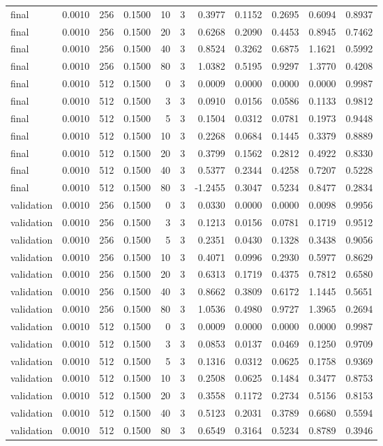 \begin{tabular}{lrrrrrrrrrr}
final & 0.0010 & 256 & 0.1500 & 10 & 3 & 0.3977 & 0.1152 & 0.2695 & 0.6094 & 0.8937 \\
final & 0.0010 & 256 & 0.1500 & 20 & 3 & 0.6268 & 0.2090 & 0.4453 & 0.8945 & 0.7462 \\
final & 0.0010 & 256 & 0.1500 & 40 & 3 & 0.8524 & 0.3262 & 0.6875 & 1.1621 & 0.5992 \\
final & 0.0010 & 256 & 0.1500 & 80 & 3 & 1.0382 & 0.5195 & 0.9297 & 1.3770 & 0.4208 \\
final & 0.0010 & 512 & 0.1500 & 0 & 3 & 0.0009 & 0.0000 & 0.0000 & 0.0000 & 0.9987 \\
final & 0.0010 & 512 & 0.1500 & 3 & 3 & 0.0910 & 0.0156 & 0.0586 & 0.1133 & 0.9812 \\
final & 0.0010 & 512 & 0.1500 & 5 & 3 & 0.1504 & 0.0312 & 0.0781 & 0.1973 & 0.9448 \\
final & 0.0010 & 512 & 0.1500 & 10 & 3 & 0.2268 & 0.0684 & 0.1445 & 0.3379 & 0.8889 \\
final & 0.0010 & 512 & 0.1500 & 20 & 3 & 0.3799 & 0.1562 & 0.2812 & 0.4922 & 0.8330 \\
final & 0.0010 & 512 & 0.1500 & 40 & 3 & 0.5377 & 0.2344 & 0.4258 & 0.7207 & 0.5228 \\
final & 0.0010 & 512 & 0.1500 & 80 & 3 & -1.2455 & 0.3047 & 0.5234 & 0.8477 & 0.2834 \\
validation & 0.0010 & 256 & 0.1500 & 0 & 3 & 0.0330 & 0.0000 & 0.0000 & 0.0098 & 0.9956 \\
validation & 0.0010 & 256 & 0.1500 & 3 & 3 & 0.1213 & 0.0156 & 0.0781 & 0.1719 & 0.9512 \\
validation & 0.0010 & 256 & 0.1500 & 5 & 3 & 0.2351 & 0.0430 & 0.1328 & 0.3438 & 0.9056 \\
validation & 0.0010 & 256 & 0.1500 & 10 & 3 & 0.4071 & 0.0996 & 0.2930 & 0.5977 & 0.8629 \\
validation & 0.0010 & 256 & 0.1500 & 20 & 3 & 0.6313 & 0.1719 & 0.4375 & 0.7812 & 0.6580 \\
validation & 0.0010 & 256 & 0.1500 & 40 & 3 & 0.8662 & 0.3809 & 0.6172 & 1.1445 & 0.5651 \\
validation & 0.0010 & 256 & 0.1500 & 80 & 3 & 1.0536 & 0.4980 & 0.9727 & 1.3965 & 0.2694 \\
validation & 0.0010 & 512 & 0.1500 & 0 & 3 & 0.0009 & 0.0000 & 0.0000 & 0.0000 & 0.9987 \\
validation & 0.0010 & 512 & 0.1500 & 3 & 3 & 0.0853 & 0.0137 & 0.0469 & 0.1250 & 0.9709 \\
validation & 0.0010 & 512 & 0.1500 & 5 & 3 & 0.1316 & 0.0312 & 0.0625 & 0.1758 & 0.9369 \\
validation & 0.0010 & 512 & 0.1500 & 10 & 3 & 0.2508 & 0.0625 & 0.1484 & 0.3477 & 0.8753 \\
validation & 0.0010 & 512 & 0.1500 & 20 & 3 & 0.3558 & 0.1172 & 0.2734 & 0.5156 & 0.8153 \\
validation & 0.0010 & 512 & 0.1500 & 40 & 3 & 0.5123 & 0.2031 & 0.3789 & 0.6680 & 0.5594 \\
validation & 0.0010 & 512 & 0.1500 & 80 & 3 & 0.6549 & 0.3164 & 0.5234 & 0.8789 & 0.3946 \\
\bottomrule
\end{tabular}
